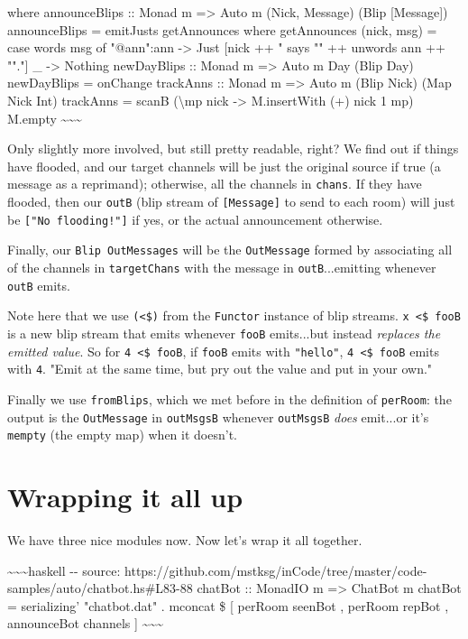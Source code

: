 \documentclass[]{article}
\begin{document}
where announceBlips :: Monad m =\textgreater{} Auto m (Nick, Message) (Blip
{[}Message{]}) announceBlips = emitJusts getAnnounces where getAnnounces (nick,
msg) = case words msg of "@ann":ann -\textgreater{} Just {[}nick ++ " says "" ++
unwords ann ++ ""."{]} \_ -\textgreater{} Nothing newDayBlips :: Monad m
=\textgreater{} Auto m Day (Blip Day) newDayBlips = onChange trackAnns :: Monad
m =\textgreater{} Auto m (Blip Nick) (Map Nick Int) trackAnns = scanB
(\textbackslash{}mp nick -\textgreater{} M.insertWith (+) nick 1 mp) M.empty
\textasciitilde{}\textasciitilde{}\textasciitilde{}

Only slightly more involved, but still pretty readable, right? We find out if
things have flooded, and our target channels will be just the original source if
true (a message as a reprimand); otherwise, all the channels in \texttt{chans}.
If they have flooded, then our \texttt{outB} (blip stream of
\texttt{{[}Message{]}} to send to each room) will just be
\texttt{{[}"No\ flooding!"{]}} if yes, or the actual announcement otherwise.

Finally, our \texttt{Blip\ OutMessages} will be the \texttt{OutMessage} formed
by associating all of the channels in \texttt{targetChans} with the message in
\texttt{outB}...emitting whenever \texttt{outB} emits.

Note here that we use \texttt{(\textless{}\$)} from the \texttt{Functor}
instance of blip streams. \texttt{x\ \textless{}\$\ fooB} is a new blip stream
that emits whenever \texttt{fooB} emits...but instead \emph{replaces the emitted
value}. So for \texttt{4\ \textless{}\$\ fooB}, if \texttt{fooB} emits with
\texttt{"hello"}, \texttt{4\ \textless{}\$\ fooB} emits with \texttt{4}. "Emit
at the same time, but pry out the value and put in your own."

Finally we use \texttt{fromBlips}, which we met before in the definition of
\texttt{perRoom}: the output is the \texttt{OutMessage} in \texttt{outMsgsB}
whenever \texttt{outMsgsB} \emph{does} emit...or it's \texttt{mempty} (the empty
map) when it doesn't.

\section{Wrapping it all up}

We have three nice modules now. Now let's wrap it all together.

\textasciitilde{}\textasciitilde{}\textasciitilde{}haskell -\/- source:
https://github.com/mstksg/inCode/tree/master/code-samples/auto/chatbot.hs\#L83-88
chatBot :: MonadIO m =\textgreater{} ChatBot m chatBot = serializing'
"chatbot.dat" . mconcat \$ {[} perRoom seenBot , perRoom repBot , announceBot
channels {]} \textasciitilde{}\textasciitilde{}\textasciitilde{}
\end{document}
